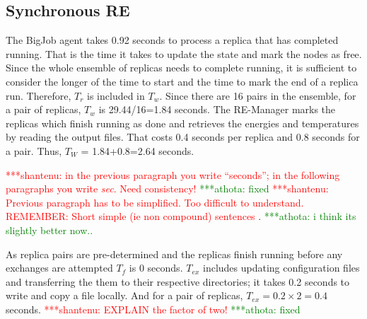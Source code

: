 \documentclass{rspublic}
\newcommand{\jhanote}[1]{ {\textcolor{red} { ***shantenu: #1 }}}
\newcommand{\alnote}[1]{ {\textcolor{blue} { ***andre: #1 }}}
\newcommand{\athotanote}[1]{ {\textcolor{green} { ***athota: #1 }}}
\newcommand{\alnote}[1]{}
\newcommand{\athotanote}[1]{}
\newcommand{\jhanote}[1]{}
\begin{document}
\subsection{Synchronous RE}
\label{sec:impl_sync_re}

The BigJob agent takes 0.92 seconds to process a replica that has
completed running.  That is the time it takes to update the state and
mark the nodes as free.  Since the whole ensemble of replicas needs to
complete running, it is sufficient to consider the longer of the time
to start and the time to mark the end of a replica run. Therefore,
$T_r$ is included in $T_w$. Since there are 16 pairs in the ensemble, for a pair of
replicas, $T_w$ is 29.44/16=1.84 seconds.  The RE-Manager marks the
replicas which finish running as done and retrieves the
energies and temperatures by reading the output files. That
 costs 0.4 seconds per replica and 0.8 seconds for a
pair. Thus, $T_W$ = 1.84+0.8=2.64 seconds.  

  \jhanote{in the previous paragraph you write
  ``seconds''; in the following paragraphs you write {\it sec}. Need
  consistency!} \athotanote{fixed} \jhanote{Previous paragraph has to be simplified.  Too
  difficult to understand. REMEMBER: Short simple (ie non compound)
  sentences}. \athotanote{i think its slightly better now..}

As replica pairs are pre-determined and the replicas finish running
before any exchanges are attempted $T _f$ is 0 seconds.  $T_{ex}$
includes updating configuration files and transferring the them to
their respective directories; it takes 0.2 seconds to write and copy a
file locally. And for a pair of replicas, $T_{ex} = 0.2 \times 2=0.4$ seconds. \jhanote{EXPLAIN
  the factor of two!} \athotanote{fixed}
\end{document}
